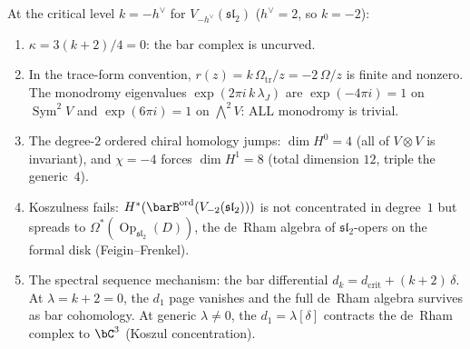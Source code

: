 \begin{proposition}
\label{prop:critical-level-ordered}
\ClaimStatusProvedHere
At the critical level $k = -h^\vee$ for
$V_{-h^\vee}(\mathfrak{sl}_2)$ ($h^\vee = 2$, so $k = -2$):
\begin{enumerate}[label=\textup{(\roman*)}]
\item $\kappa = 3(k+2)/4 = 0$: the bar complex is uncurved.
\item In the trace-form convention,
 $r(z) = k\,\Omega_{\mathrm{tr}}/z = -2\,\Omega/z$ is finite and nonzero.
 The monodromy eigenvalues
 $\exp(2\pi i\,k\,\lambda_J)$ are
 $\exp(-4\pi i) = 1$ on $\operatorname{Sym}^2 V$ and
 $\exp(6\pi i) = 1$ on $\bigwedge^2 V$:
 ALL monodromy is trivial.
\item The degree-$2$ ordered chiral homology jumps:
 $\dim H^0 = 4$ \textup{(}all of $V \otimes V$ is
 invariant\textup{)}, and
 $\chi = -4$ forces $\dim H^1 = 8$
 \textup{(}total dimension $12$, triple the generic~$4$\textup{)}.
\item Koszulness fails: $H^*(\barB^{\mathrm{ord}}
 (V_{-2}(\mathfrak{sl}_2)))$ is not concentrated in
 degree~$1$ but spreads to
 $\Omega^*(\operatorname{Op}_{\mathfrak{sl}_2}(D))$,
 the de~Rham algebra of $\mathfrak{sl}_2$-opers
 on the formal disk \textup{(}Feigin--Frenkel\textup{)}.
\item The spectral sequence mechanism: the bar
 differential $d_k = d_{\mathrm{crit}} + (k+2)\,\delta$.
 At $\lambda = k + 2 = 0$, the $d_1$ page vanishes and
 the full de~Rham algebra survives as bar cohomology.
 At generic $\lambda \neq 0$, the $d_1 = \lambda[\delta]$
 contracts the de~Rham complex to $\bC^3$
 \textup{(}Koszul concentration\textup{)}.
\end{enumerate}
\end{proposition}

